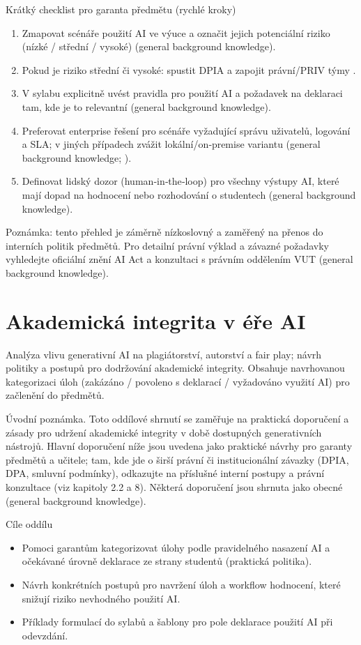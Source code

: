 \documentclass{report}%
\begin{document}
Krátký checklist pro garanta předmětu (rychlé kroky)
\begin{enumerate}
  \item Zmapovat scénáře použití AI ve výuce a označit jejich potenciální riziko (nízké / střední / vysoké) (general background knowledge).
  \item Pokud je riziko střední či vysoké: spustit DPIA a zapojit právní/PRIV týmy \cite{kb_malinka_chatgpt_ve_vyuce_dva_roky_pote_2024_pdf_90bc3aaf_page_12_1}.
  \item V sylabu explicitně uvést pravidla pro použití AI a požadavek na deklaraci tam, kde je to relevantní (general background knowledge).
  \item Preferovat enterprise řešení pro scénáře vyžadující správu uživatelů, logování a SLA; v jiných případech zvážit lokální/on‑premise variantu (general background knowledge; \cite{kb_ai_101_tipu_pdf_04e4a115_page_15_2}).
  \item Definovat lidský dozor (human‑in‑the‑loop) pro všechny výstupy AI, které mají dopad na hodnocení nebo rozhodování o studentech (general background knowledge).
\end{enumerate}

Poznámka: tento přehled je záměrně nízkoslovný a zaměřený na přenos do interních politik předmětů. Pro detailní právní výklad a závazné požadavky vyhledejte oficiální znění AI Act a konzultaci s právním oddělením VUT (general background knowledge).%

%
\section{Akademická integrita v éře AI}%
Analýza vlivu generativní AI na plagiátorství, autorství a fair play; návrh politiky a postupů pro dodržování akademické integrity. Obsahuje navrhovanou kategorizaci úloh (zakázáno / povoleno s deklarací / vyžadováno využití AI) pro začlenění do předmětů.%


%
Úvodní poznámka. Toto oddílové shrnutí se zaměřuje na praktická doporučení a zásady pro udržení akademické integrity v době dostupných generativních nástrojů. Hlavní doporučení níže jsou uvedena jako praktické návrhy pro garanty předmětů a učitele; tam, kde jde o širší právní či institucionální závazky (DPIA, DPA, smluvní podmínky), odkazujte na příslušné interní postupy a právní konzultace (viz kapitoly 2.2 a 8). Některá doporučení jsou shrnuta jako obecné (general background knowledge).

Cíle oddílu
\begin{itemize}
  \item Pomoci garantům kategorizovat úlohy podle pravidelného nasazení AI a očekávané úrovně deklarace ze strany studentů (praktická politika).
  \item Návrh konkrétních postupů pro navržení úloh a workflow hodnocení, které snižují riziko nevhodného použití AI.
  \item Příklady formulací do sylabů a šablony pro pole deklarace použití AI při odevzdání.
\end{itemize}
\end{document}
